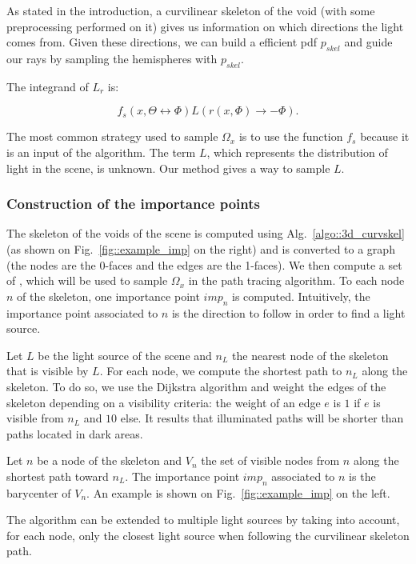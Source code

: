 As stated in the introduction, a curvilinear skeleton of the void (with some preprocessing performed on it) gives us information on which directions the light comes from. Given these directions, we can build a efficient pdf $p_{skel}$ and guide our rays by sampling the hemispheres with $p_{skel}$.

The integrand of $L_r$ is:

\begin{equation*}
f_s(x, \Theta \leftrightarrow \Phi) L(r(x, \Phi) \rightarrow -\Phi).
\end{equation*}

The most common strategy used to sample $\Omega_x$ is to use the function $f_s$ because it is an input of the algorithm.
The term $L$, which represents the distribution of light in the scene, is unknown. Our method gives a way to sample $L$.


\subsubsection{Construction of the importance points}

The skeleton of the voids of the scene is computed using Alg.~\ref{algo::3d_curvskel} (as shown on Fig.~\ref{fig::example_imp} on the right) and is converted to a graph (the nodes are the 0-faces and the edges are the 1-faces). We then compute a set of , which will be used to sample $\Omega_x$ in the path tracing algorithm. To each node $n$ of the skeleton, one importance point $imp_n$ is computed. Intuitively, the importance point associated to $n$ is the direction to follow in order to find a light source.

Let $L$ be the light source of the scene and $n_L$ the nearest node of the skeleton that is visible by $L$. For each node, we compute the shortest path to $n_L$ along the skeleton. To do so, we use the Dijkstra algorithm and weight the edges of the skeleton depending on a visibility criteria: the weight of an edge $e$ is $1$ if $e$ is visible from $n_L$ and $10$ else. It results that illuminated paths will be shorter than paths located in dark areas.

Let $n$ be a node of the skeleton and $V_n$ the set of visible nodes from $n$ along the shortest path toward $n_L$. The importance point $imp_n$ associated to $n$ is the barycenter of $V_n$. An example is shown on Fig.~\ref{fig::example_imp} on the left.

The algorithm can be extended to multiple light sources by taking into account, for each node, only the closest light source when following the curvilinear skeleton path.

